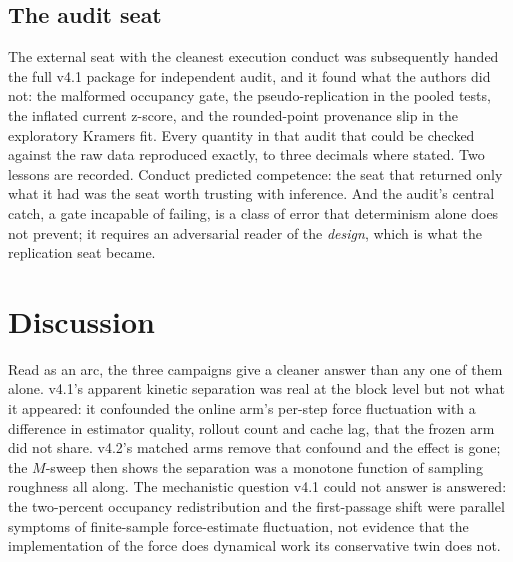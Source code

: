 \documentclass[11pt]{article}
\begin{document}
\subsection{The audit seat}
The external seat with the cleanest execution conduct was subsequently handed the full v4.1 package for independent audit, and it found what the authors did not: the malformed occupancy gate, the pseudo-replication in the pooled tests, the inflated current z-score, and the rounded-point provenance slip in the exploratory Kramers fit. Every quantity in that audit that could be checked against the raw data reproduced exactly, to three decimals where stated. Two lessons are recorded. Conduct predicted competence: the seat that returned only what it had was the seat worth trusting with inference. And the audit's central catch, a gate incapable of failing, is a class of error that determinism alone does not prevent; it requires an adversarial reader of the \emph{design}, which is what the replication seat became.

\section{Discussion}\label{sec:v42}
Read as an arc, the three campaigns give a cleaner answer than any one of them alone. v4.1's apparent kinetic separation was real at the block level but not what it appeared: it confounded the online arm's per-step force fluctuation with a difference in estimator quality, rollout count and cache lag, that the frozen arm did not share. v4.2's matched arms remove that confound and the effect is gone; the $M$-sweep then shows the separation was a monotone function of sampling roughness all along. The mechanistic question v4.1 could not answer is answered: the two-percent occupancy redistribution and the first-passage shift were parallel symptoms of finite-sample force-estimate fluctuation, not evidence that the implementation of the force does dynamical work its conservative twin does not.
\end{document}
